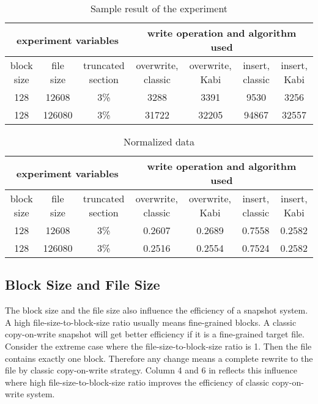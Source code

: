 \begin{lscape} 
\begin{table}
\caption{Sample result of the experiment}
\label{tab:sample_result}
\begin{center}
\begin{tabular}{|c|c|c|c|c|c|c|}
\hline
\multicolumn{3}{|c|}{experiment variables} & \multicolumn{4}{c|}{write operation and algorithm used} \\
\hline
block size & file size & truncated section & overwrite, classic & overwrite, Kabi & insert, classic & insert, Kabi\\
\hline
128 & 12608 & 3\% & 3288 & 3391 & 9530 & 3256 \\
\hline
128 & 126080 & 3\% & 31722 & 32205 & 94867 & 32557 \\
\hline
\end{tabular}
\end{center}
\end{table}

\begin{table}
\caption{Normalized data}
\label{tab:norm}
\begin{center}
\begin{tabular}{|c|c|c|c|c|c|c|}
\hline
\multicolumn{3}{|c|}{experiment variables} & \multicolumn{4}{c|}{write operation and algorithm used} \\
\hline
block size & file size & truncated section & overwrite, classic & overwrite, Kabi & insert, classic & insert, Kabi\\
\hline
128 & 12608 & 3\% & 0.2607 & 0.2689 & 0.7558 & 0.2582 \\
\hline
128 & 126080 & 3\% & 0.2516 & 0.2554 & 0.7524 & 0.2582 \\
\hline
\end{tabular}
\end{center}
\end{table}
\end{lscape}

\subsection{Block Size and File Size}

    The block size and the file size also influence the efficiency of a snapshot system. A high file-size-to-block-size ratio usually means fine-grained blocks. A classic copy-on-write snapshot will get better efficiency if it is a fine-grained target file. Consider the extreme case where the file-size-to-block-size ratio is 1. Then the file contains exactly one block. Therefore any change means a complete rewrite to the file by classic copy-on-write strategy. Column 4 and 6 in  reflects this influence where high file-size-to-block-size ratio improves the efficiency of classic copy-on-write system.

